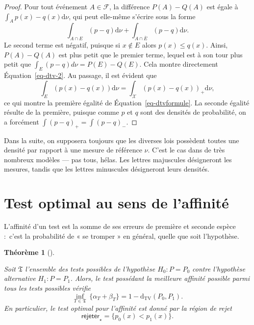 \documentclass[
  10,
  letterpaper,
  DIV=11,
  numbers=noendperiod]{scrreport}
\newcommand{\dtv}{\mathrm{d}_{\mathrm{TV}}}
\theoremstyle{plain}
\newtheorem{theorem}{Théorème}[chapter]
\theoremstyle{definition}
\theoremstyle{plain}
\theoremstyle{definition}
\theoremstyle{definition}
\theoremstyle{plain}
\theoremstyle{remark}
\begin{document}
\begin{proof}

Pour tout événement \(A \in \mathscr{F}\), la différence \(P(A) - Q(A)\)
est égale à \(\int_A p(x) - q(x) \mathrm{d}\nu\), qui peut elle-même
s'écrire sous la forme
\[\int_{A \cap E} (p - q) \mathrm{d}\nu + \int_{A \cap \bar{E}} (p - q) \mathrm{d}\nu.\]
Le second terme est négatif, puisque si \(x \notin E\) alors
\(p(x)\leqslant q(x)\). Ainsi, \(P(A) - Q(A)\) est plus petit que le
premier terme, lequel est à son tour plus petit que
\(\int_E (p-q)d\nu = P(E) - Q(E)\). Cela montre directement
Équation~\ref{eq-dtv-2}. Au passage, il est évident que
\[\int_E (p(x)-q(x))\mathrm{d}\nu = \int_{\mathcal{X}}(p(x) - q(x))_+ \mathrm{d}\nu,  \]
ce qui montre la première égalité de Équation~\ref{eq-dtvformule}. La
seconde égalité résulte de la première, puisque comme \(p\) et \(q\)
sont des densités de probabilité, on a forcément
\(\int (p-q)_+ = \int(p-q)_-\).

\end{proof}

Dans la suite, on supposera toujours que les diverses lois possèdent
toutes une densité par rapport à une mesure de référence \(\nu\). C'est
le cas dans de très nombreux modèles --- pas tous, hélas. Les lettres
majuscules désigneront les mesures, tandis que les lettres minuscules
désigneront leurs densités.

\hypertarget{test-optimal-au-sens-de-laffinituxe9}{%
\section{Test optimal au sens de
l'affinité}\label{test-optimal-au-sens-de-laffinituxe9}}

L'affinité d'un test est la somme de ses erreurs de première et seconde
espèce :~c'est la probabilité de « se tromper » en général, quelle que
soit l'hypothèse.

\newcommand{\reject}{\mathsf{rejeter}}

\begin{theorem}[]\protect\hypertarget{thm-affinity}{}\label{thm-affinity}

Soit \(\mathfrak{T}\) l'ensemble des tests possibles de l'hypothèse
\(H_0 : P = P_0\) contre l'hypothèse alternative \(H_1 : P = P_1\).
Alors, le test possédant la meilleure affinité possible parmi tous les
tests possibles vérifie
\[\inf_{T \in \mathfrak{T}}~\{\alpha_T + \beta_T \} = 1 - \dtv(P_0, P_1). \]
En particulier, le test optimal pour l'affinité est donné par la région
de rejet \[ \mathsf{rejeter}_\star = \{p_0(x) < p_1(x)\}.\]

\end{theorem}
\end{document}
